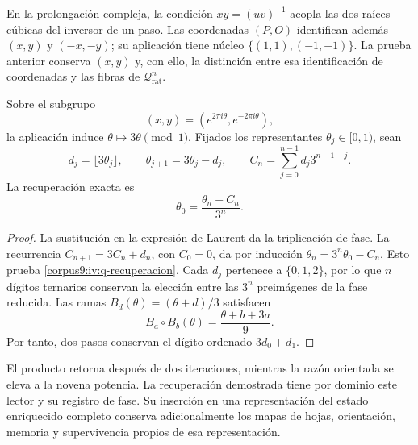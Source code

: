 En la prolongación compleja, la condición \(xy=(uv)^{-1}\)
acopla las dos raíces cúbicas del inversor de un paso. Las
coordenadas \((P,O)\) identifican además
\((x,y)\) y \((-x,-y)\); su aplicación tiene núcleo
\(\{(1,1),(-1,-1)\}\). La prueba anterior conserva \((x,y)\)
y, con ello, la distinción entre esa identificación de coordenadas
y las fibras de \(\mathcal Q_{\mathrm{rat}}^n\).

\begin{proposition}
\label{corpus9:iv:q-acarreo}
Sobre el subgrupo
\[
 (x,y)=(e^{2\pi i\theta},e^{-2\pi i\theta}),
\]
la aplicación induce \(\theta\mapsto3\theta\pmod1\).
Fijados los representantes \(\theta_j\in[0,1)\), sean
\[
 d_j=\lfloor3\theta_j\rfloor,\qquad
 \theta_{j+1}=3\theta_j-d_j,\qquad
 C_n=\sum_{j=0}^{n-1}d_j3^{n-1-j}.
\]
La recuperación exacta es
\begin{equation}
 \theta_0=\frac{\theta_n+C_n}{3^n}.
 \label{corpus9:iv:q-recuperacion}
\end{equation}
\end{proposition}
\begin{proof}
La sustitución en la expresión de Laurent da la triplicación de
fase. La recurrencia \(C_{n+1}=3C_n+d_n\), con \(C_0=0\),
da por inducción \(\theta_n=3^n\theta_0-C_n\). Esto prueba
\eqref{corpus9:iv:q-recuperacion}. Cada \(d_j\) pertenece a
\(\{0,1,2\}\), por lo que \(n\) dígitos ternarios conservan
la elección entre las \(3^n\) preimágenes de la fase reducida.
Las ramas \(B_d(\theta)=(\theta+d)/3\) satisfacen
\[
 B_a\circ B_b(\theta)=\frac{\theta+b+3a}{9}.
\]
Por tanto, dos pasos conservan el dígito ordenado \(3d_0+d_1\).
\end{proof}

El producto retorna después de dos iteraciones, mientras la razón
orientada se eleva a la novena potencia. La recuperación demostrada
tiene por dominio este lector y su registro de fase. Su inserción
en una representación del estado enriquecido completo conserva
adicionalmente los mapas de hojas, orientación, memoria y
supervivencia propios de esa representación.
